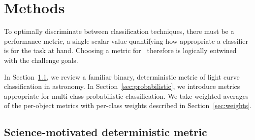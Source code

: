 \section{Methods}
\label{sec:methods}


To optimally discriminate between classification techniques, there must be a performance metric, a single scalar value quantifying how appropriate a classifier is for the task at hand.
Choosing a metric for \plasticc\ therefore is logically entwined with the challenge goals.


In Section~\ref{sec:deterministic}, we review a familiar binary, deterministic metric of light curve classification in astronomy.
In Section~\ref{sec:probabilistic}, we introduce metrics appropriate for multi-class probabilistic classification.
We take weighted averages of the per-object metrics with per-class weights described in Section~\ref{sec:weights}.

\subsection{Science-motivated deterministic metric}
\label{sec:deterministic}


